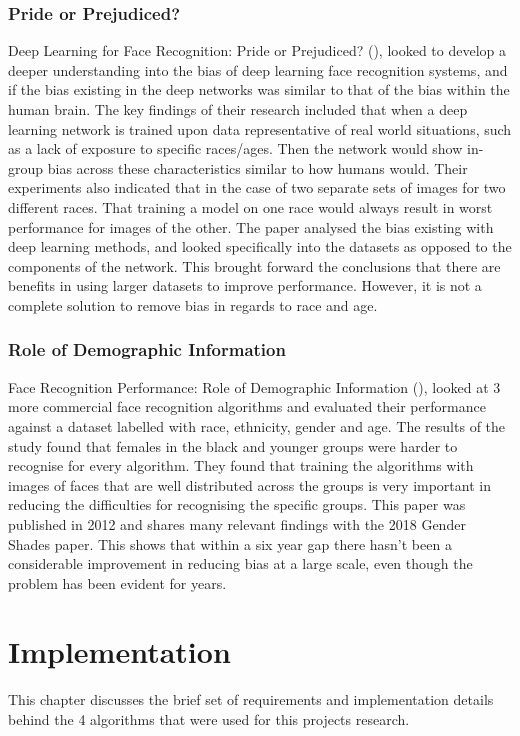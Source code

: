\documentclass{l4proj}
\begin{document}
\subsection{Pride or Prejudiced?}
Deep Learning for Face Recognition: Pride or Prejudiced? (\cite{prideorpre}), looked to develop a deeper understanding into the bias of deep learning face recognition systems, and if the bias existing in the deep networks was similar to that of the bias within the human brain. The key findings of their research included that when a deep learning network is trained upon data representative of real world situations, such as a lack of exposure to specific races/ages. Then the network would show in-group bias across these characteristics similar to how humans would. Their experiments also indicated that in the case of two separate sets of images for two different races. That training a model on one race would always result in worst performance for images of the other. The paper analysed the bias existing with deep learning methods, and looked specifically into the datasets as opposed to the components of the network. This brought forward the conclusions that there are benefits in using larger datasets to improve performance. However, it is not a complete solution to remove bias in regards to race and age.
\subsection{Role of Demographic Information}
Face Recognition Performance: Role of Demographic Information (\cite{demographic}), looked at 3 more commercial face recognition algorithms and evaluated their performance against a dataset labelled with race, ethnicity, gender and age. The results of the study found that females in the black and younger groups were harder to recognise for every algorithm. They found that training the algorithms with images of faces that are well distributed across the groups is very important in reducing the difficulties for recognising the specific groups. This paper was published in 2012 and shares many relevant findings with the 2018 Gender Shades paper. This shows that within a six year gap there hasn't been a considerable improvement in reducing bias at a large scale, even though the problem has been evident for years.

\chapter{Implementation}
\label{implementation}
This chapter discusses the brief set of requirements and implementation details behind the 4 algorithms that were used for this projects research. 
\end{document}
